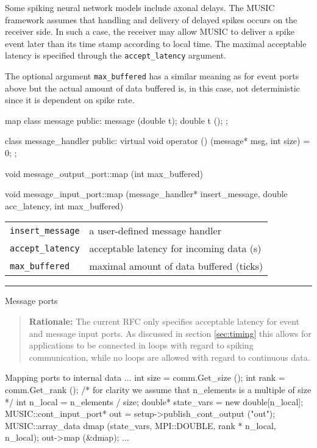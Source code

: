 \documentclass[a4paper]{report}
\makeatletter
\newenvironment{rationale}%
{\par\begin{quote}\textbf{Rationale:}}%
{\par\end{quote}}
\newenvironment{parameters}%
{\begin{tabular}{@{\hspace{2em}}lp{0.6\textwidth}}}%
{\end{tabular}\par\vspace{1mm}\par\hrule\par\vspace{5mm}}
\makeatother
\begin{document}
Some spiking neural network models include axonal delays.  The MUSIC
framework assumes that handling and delivery of delayed spikes occurs
on the receiver side.  In such a case, the receiver may allow MUSIC to
deliver a spike event later than its time stamp according to local
time.  The maximal acceptable latency is specified through the
\lstinline|accept_latency| argument.

The optional argument \lstinline|max_buffered| has a similar meaning
as for event ports above but the actual amount of data buffered is, in
this case, not deterministic since it is dependent on spike rate.
  
\begin{head}{map}
  class message {
   public:
    message (double t);
    double t ();
  };

  class message_handler {
  public:
    virtual void operator () (message* msg, int size) = 0;
  };
  
  void message_output_port::map (int max_buffered)
                               
  void message_input_port::map (message_handler* insert_message,
                                double acc_latency,
                                int max_buffered)
\end{head}
\begin{parameters}
  \lstinline|insert_message| & a user-defined message handler \\
  \lstinline|accept_latency| & acceptable latency for incoming data (s) \\
  \lstinline|max_buffered| & maximal amount of data buffered (ticks) \\
\end{parameters}

Message ports

\begin{rationale}
  The current RFC only specifies acceptable latency for event and
  message input ports.  As discussed in section \ref{sec:timing} this
  allows for applications to be connected in loops with regard to
  spiking communication, while no loops are allowed with regard to
  continuous data.
\end{rationale}

\begin{code}{Mapping ports to internal data\label{code:mapping}}
{
  ...
  int size = comm.Get_size ();
  int rank = comm.Get_rank ();
  /* for clarity we assume that n_elements
     is a multiple of size */
  int n_local = n_elements / size;
  double* state_vars = new double[n_local];
  MUSIC::cont_input_port* out =
     setup->publish_cont_output ("out");
  MUSIC::array_data dmap (state_vars, MPI::DOUBLE,
                          rank * n_local, n_local);
  out->map (&dmap);
  ...
}
\end{code}
\end{document}
